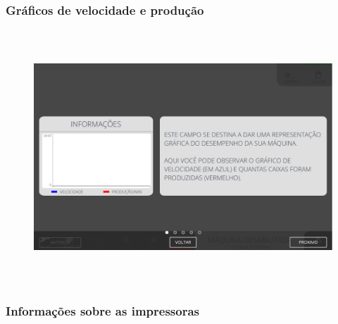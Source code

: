 \newpage
\thispagestyle{fancy}

\vspace*{40 pt}

\subsubsection{\small{Gráficos de velocidade e produção}}\label{telaPrincialGraficosVelocidadeProducao}

\vspace*{\fill}

\begin{figure}[h]
  \centering
  \includegraphics[width=576px,height=360px]{src/imagesFlexo/01-main/e-1.png}
\end{figure}

\vspace*{\fill}

\newpage
\thispagestyle{fancy}

\vspace*{40 pt}

\subsubsection{\small{Informações sobre as impressoras}}\label{telaPrincialInformacoesImpressoras}

\vspace*{\fill}

